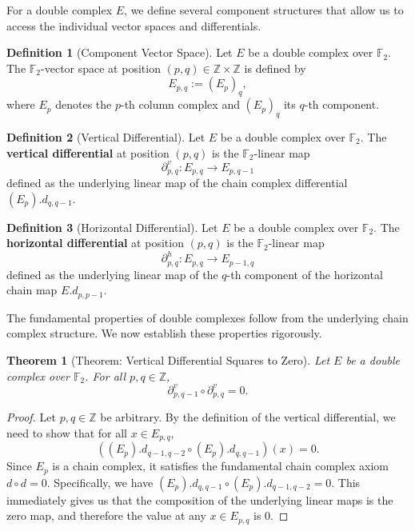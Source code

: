 \documentclass[11pt]{article}
\theoremstyle{plain}
\newtheorem*{theorem}{Theorem}
\theoremstyle{definition}
\newtheorem*{definition}{Definition}
\theoremstyle{remark}
\begin{document}
For a double complex $E$, we define several component structures that allow us to access the individual vector spaces and differentials.

\begin{definition}[Component Vector Space]
Let $E$ be a double complex over $\mathbb{F}_2$. The $\mathbb{F}_2$-vector space at position $(p, q) \in \mathbb{Z} \times \mathbb{Z}$ is defined by
\[
  E_{p,q} := (E_p)_q,
\]
where $E_p$ denotes the $p$-th column complex and $(E_p)_q$ its $q$-th component.
\end{definition}

\begin{definition}[Vertical Differential]
Let $E$ be a double complex over $\mathbb{F}_2$. The \textbf{vertical differential} at position $(p,q)$ is the $\mathbb{F}_2$-linear map
\[
  \partial^v_{p,q} : E_{p,q} \to E_{p,q-1}
\]
defined as the underlying linear map of the chain complex differential $(E_p).d_{q,q-1}$.
\end{definition}

\begin{definition}[Horizontal Differential]
Let $E$ be a double complex over $\mathbb{F}_2$. The \textbf{horizontal differential} at position $(p,q)$ is the $\mathbb{F}_2$-linear map
\[
  \partial^h_{p,q} : E_{p,q} \to E_{p-1,q}
\]
defined as the underlying linear map of the $q$-th component of the horizontal chain map $E.d_{p,p-1}$.
\end{definition}

The fundamental properties of double complexes follow from the underlying chain complex structure. We now establish these properties rigorously.

\begin{theorem}[Theorem: Vertical Differential Squares to Zero]
Let $E$ be a double complex over $\mathbb{F}_2$. For all $p, q \in \mathbb{Z}$,
\[
  \partial^v_{p,q-1} \circ \partial^v_{p,q} = 0.
\]
\end{theorem}

\begin{proof}
Let $p, q \in \mathbb{Z}$ be arbitrary. By the definition of the vertical differential, we need to show that for all $x \in E_{p,q}$,
\[
  ((E_p).d_{q-1,q-2} \circ (E_p).d_{q,q-1})(x) = 0.
\]
Since $E_p$ is a chain complex, it satisfies the fundamental chain complex axiom $d \circ d = 0$. Specifically, we have $(E_p).d_{q,q-1} \circ (E_p).d_{q-1,q-2} = 0$. This immediately gives us that the composition of the underlying linear maps is the zero map, and therefore the value at any $x \in E_{p,q}$ is $0$.
\end{proof}
\end{document}
